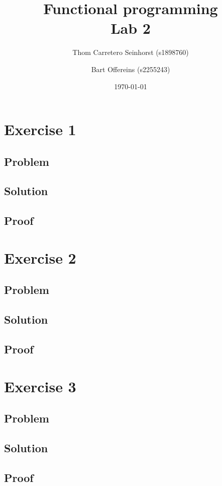 \documentclass[a4paper,11pt]{article}
\author{Thom Carretero Seinhorst (s1898760) \and Bart Offereins (s2255243)}
\date{\today}
\title{Functional programming \\Lab 2}
\begin{document}
  \maketitle
  
\section{Exercise 1}
\subsection{Problem}

\subsection{Solution}

\subsection{Proof}

\section{Exercise 2}
\subsection{Problem}

\subsection{Solution}

\subsection{Proof}

\section{Exercise 3}
\subsection{Problem}

\subsection{Solution}

\subsection{Proof}
\end{document}
